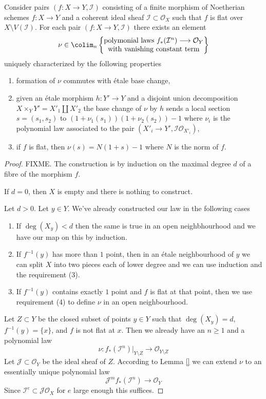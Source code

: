 \begin{lemma}
\label{lemma-norm}
Consider pairs $(f : X \to Y, \mathcal{I})$ consisting of a
finite morphism of Noetherian schemes $f : X \to Y$ and a
coherent ideal sheaf $\mathcal{I} \subset \mathcal{O}_X$
such that $f$ is flat over $X \setminus V(\mathcal{I})$.
For each pair $(f : X \to Y, \mathcal{I})$ there exists an
element
$$
\nu \in \colim_n
\left\{
\begin{matrix}
\text{polymonial laws }
f_*(\mathcal{I}^n) \longrightarrow \mathcal{O}_Y \\
\text{with vanishing constant term}
\end{matrix}
\right\}
$$
uniquely characterized by the following properties
\begin{enumerate}
\item formation of $\nu$ commutes with \'etale base change,
\item given an \'etale morphism $h : Y' \to Y$ and a disjoint union
decomposition $X \times_Y Y' = X'_1 \amalg X'_2$ the base change
of $\nu$ by $h$ sends a local section $s = (s_1, s_2)$
to $(1 + \nu_1(s_1))(1 + \nu_2(s_2)) - 1$ where
$\nu_i$ is the polynomial law
associated to the pair $(X'_i \to Y', \mathcal{I}\mathcal{O}_{X'_i})$,
\item if $f$ is flat, then $\nu(s) = N(1 + s) - 1$
where $N$ is the norm of $f$.
\end{enumerate}
\end{lemma}

\begin{proof}
FIXME. The construction is by induction on the maximal degree $d$ of
a fibre of the morphism $f$.

\medskip\noindent
If $d = 0$, then $X$ is empty and there is nothing to construct.

\medskip\noindent
Let $d > 0$. Let $y \in Y$. We've already constructed our law
in the following cases
\begin{enumerate}
\item If $\deg(X_y) < d$ then the same is true in an open
neighbhourhood and we have our map on this by induction.
\item If $f^{-1}(y)$ has more than $1$ point, then
in an \'etale neighbourhood of $y$ we can split
$X$ into two pieces each of lower degree and we can
use induction and the requirement (3).
\item If $f^{-1}(y)$ contains exactly $1$ point and $f$ is flat at
that point, then we use requirement (4) to define $\nu$ in an
open neighbourhood.
\end{enumerate}
Let $Z \subset Y$ be the closed subset of points $y \in Y$
such that $\deg(X_y) = d$, $f^{-1}(y) = \{x\}$, and $f$ is not
flat at $x$. Then we already have an $n \geq 1$
and a polynomial law
$$
\nu :
f_*(\mathcal{I}^n)|_{Y \setminus Z}
\longrightarrow
\mathcal{O}_{Y \setminus Z}
$$
Let $\mathcal{J} \subset \mathcal{O}_Y$ be the ideal sheaf of $Z$.
According to Lemma \ref{}
we can extend $\nu$ to an essentially unique polynomial law
$$
\mathcal{J}^mf_*(\mathcal{I}^n)
\longrightarrow
\mathcal{O}_Y
$$
Since $\mathcal{I}^e \subset \mathcal{J}\mathcal{O}_X$
for $e$ large enough this suffices.
\end{proof}


